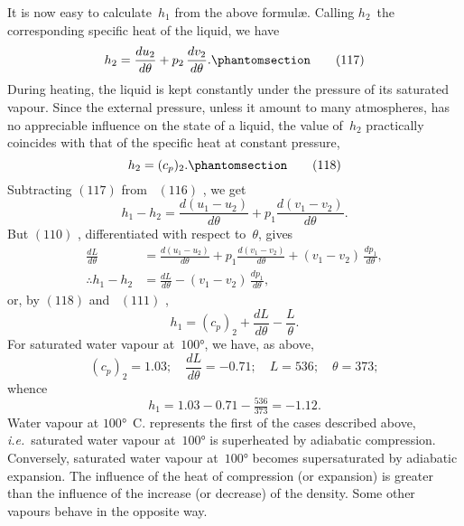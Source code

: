 \documentclass[12pt]{book}[2005/09/16]
\newcommand{\Tag}[1]{%
  \phantomsection\label{eqn:#1}\tag*{\ensuremath{#1}}%
}
\newcommand{\Eq}[1]{%
  \hyperref[eqn:#1]{\ensuremath{#1}}%
}
\newcommand{\PageSep}[1]{\ignorespaces}
\newcommand{\ie}{\emph{i.e.}}
\begin{document}
It is now easy to calculate~$h_{1}$ from the above formulæ.
Calling $h_{2}$~the corresponding specific heat of the liquid, we
have
\[
h_{2} = \frac{du_{2}}{d\theta} + p_{2}\, \frac{dv_{2}}{d\theta}.
\Tag{(117)}
\]
During heating, the liquid is kept constantly under the
pressure of its saturated vapour. Since the external
pressure, unless it amount to many atmospheres, has no
appreciable influence on the state of a liquid, the value of~$h_{2}$
practically coincides with that of the specific heat at
constant pressure,
\[
h_{2} = (c_{p})_{2}.
\Tag{(118)}
\]
Subtracting \Eq{(117)} from~\Eq{(116)}, we get
\[
h_{1} - h_{2} = \frac{d(u_{1} - u_{2})}{d\theta} + p_{1} \frac{d(v_{1} - v_{2})}{d\theta}.
\]
But \Eq{(110)}, differentiated with respect to~$\theta$, gives
\begin{align*}
\frac{dL}{d\theta} &= \frac{d(u_{1} - u_{2})}{d\theta} + p_{1} \frac{d(v_{1} - v_{2})}{d\theta} + (v_{1} - v_{2})\, \frac{dp_{1}}{d\theta}, \\
\therefore
h_{1} - h_{2} &= \frac{dL}{d\theta} - (v_{1} - v_{2})\, \frac{dp_{1}}{d\theta},
\end{align*}
or, by \Eq{(118)} and~\Eq{(111)},
\[
h_{1} = (c_{p})_{2} + \frac{dL}{d\theta} - \frac{L}{\theta}.
\]
For saturated water vapour at~$100°$, we have, as above,
\[
(c_{p})_{2} = 1.03;\quad
\frac{dL}{d\theta} = -0.71;\quad
L = 536;\quad
\theta = 373;
\]
\PageSep{152}
whence
\[
h_{1} = 1.03 - 0.71 - \tfrac{536}{373} = -1.12.
\]
Water vapour at $100°$~C. represents the first of the cases
described above, \ie\ saturated water vapour at~$100°$ is
superheated by adiabatic compression. Conversely, saturated
water vapour at~$100°$ becomes supersaturated by
adiabatic expansion. The influence of the heat of compression
(or expansion) is greater than the influence of the
increase (or decrease) of the density. Some other vapours
behave in the opposite way.
\end{document}

